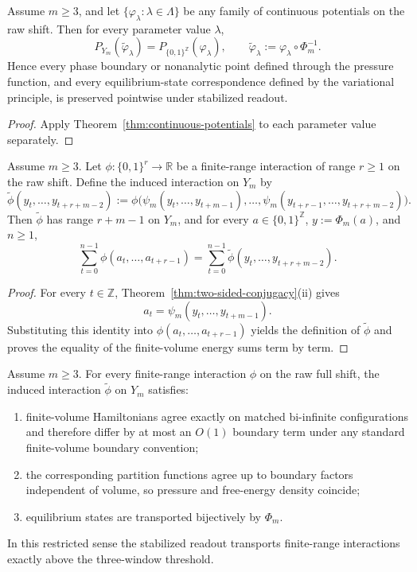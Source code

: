 \begin{corollary}\label{cor:phase-diagram}
Assume $m\ge 3$, and let $\{\varphi_\lambda:\lambda\in\Lambda\}$ be any family of continuous potentials on the raw shift. Then for every parameter value $\lambda$,
\[
P_{Y_m}(\widetilde\varphi_\lambda)=P_{\{0,1\}^{\mathbb Z}}(\varphi_\lambda),
\qquad
\widetilde\varphi_\lambda:=\varphi_\lambda\circ\Phi_m^{-1}.
\]
Hence every phase boundary or nonanalytic point defined through the pressure function, and every equilibrium-state correspondence defined by the variational principle, is preserved pointwise under stabilized readout.
\end{corollary}

\begin{proof}
Apply Theorem~\ref{thm:continuous-potentials} to each parameter value separately.
\end{proof}

\begin{proposition}\label{prop:finite-range-renorm}
Assume $m\ge 3$. Let $\phi:\{0,1\}^r\to\mathbb R$ be a finite-range interaction of range $r\ge 1$ on the raw shift. Define the induced interaction on $Y_m$ by
\[
\widetilde{\phi}(y_t,\dots,y_{t+r+m-2})
:=
\phi\bigl(\psi_m(y_t,\dots,y_{t+m-1}),\dots,\psi_m(y_{t+r-1},\dots,y_{t+r+m-2})\bigr).
\]
Then $\widetilde{\phi}$ has range $r+m-1$ on $Y_m$, and for every $a\in\{0,1\}^{\mathbb Z}$, $y:=\Phi_m(a)$, and $n\ge 1$,
\[
\sum_{t=0}^{n-1}\phi(a_t,\dots,a_{t+r-1})
=
\sum_{t=0}^{n-1}\widetilde{\phi}(y_t,\dots,y_{t+r+m-2}).
\]
\end{proposition}

\begin{proof}
For every $t\in\mathbb Z$, Theorem~\ref{thm:two-sided-conjugacy}(ii) gives
\[
a_t=\psi_m(y_t,\dots,y_{t+m-1}).
\]
Substituting this identity into $\phi(a_t,\dots,a_{t+r-1})$ yields the definition of $\widetilde{\phi}$ and proves the equality of the finite-volume energy sums term by term.
\end{proof}

\begin{corollary}\label{cor:thermo-equivalence}
Assume $m\ge 3$. For every finite-range interaction $\phi$ on the raw full shift, the induced interaction $\widetilde{\phi}$ on $Y_m$ satisfies:
\begin{enumerate}[label=(\roman*),leftmargin=*,itemsep=2pt]
  \item finite-volume Hamiltonians agree exactly on matched bi-infinite configurations and therefore differ by at most an $O(1)$ boundary term under any standard finite-volume boundary convention;
  \item the corresponding partition functions agree up to boundary factors independent of volume, so pressure and free-energy density coincide;
  \item equilibrium states are transported bijectively by $\Phi_m$.
\end{enumerate}
In this restricted sense the stabilized readout transports finite-range interactions exactly above the three-window threshold.
\end{corollary}

